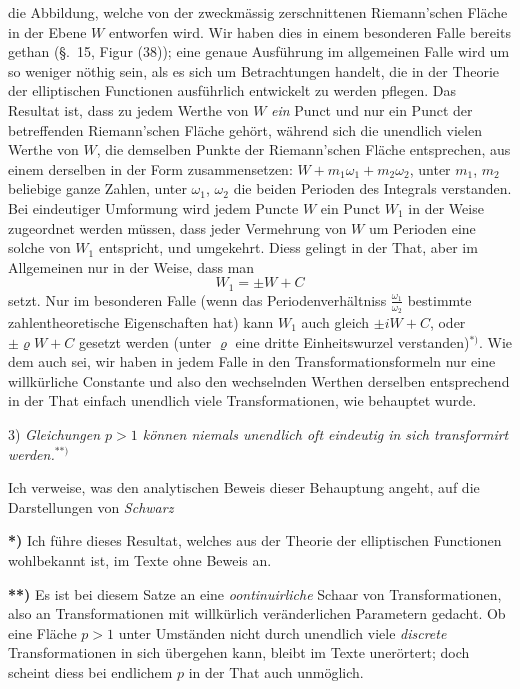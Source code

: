 \documentclass{article}
\begin{document}
die Abbildung, welche von der zweckmässig zerschnittenen Riemann'schen Fläche in der Ebene $W$ entworfen wird. Wir haben dies in einem besonderen Falle bereits gethan (§.~15, Figur (38)); eine genaue Ausführung im allgemeinen Falle wird um so weniger nöthig sein, als es sich um Betrachtungen handelt, die in der Theorie der elliptischen Functionen ausführlich entwickelt zu werden pflegen. Das Resultat ist, dass zu jedem Werthe von $W$ \emph{ein} Punct und nur ein Punct der betreffenden Riemann'schen Fläche gehört, während sich die unendlich vielen Werthe von $W$, die demselben Punkte der Riemann'schen Fläche entsprechen, aus einem derselben in der Form zusammensetzen: $W + m_{1}\omega_{1} + m_{2}\omega_{2}$, unter $m_{1}$, $m_{2}$ beliebige ganze Zahlen, unter $\omega_{1}$, $\omega_{2}$ die beiden Perioden des Integrals verstanden. Bei eindeutiger Umformung wird jedem Puncte $W$ ein Punct $W_{1}$ in der Weise zugeordnet werden müssen, dass jeder Vermehrung von $W$ um Perioden eine solche von $W_{1}$ entspricht, und umgekehrt. Diess gelingt in der That, aber im Allgemeinen nur in der Weise, dass man
\[ W_{1} = \pm W + C \]
setzt. Nur im besonderen Falle (wenn das Periodenverhältniss $\frac{\omega_{1}}{\omega_{2}}$ bestimmte zahlentheoretische Eigenschaften hat) kann $W_{1}$ auch gleich $\pm iW + C$, oder $\pm \varrho W + C$ gesetzt werden (unter $\varrho$ eine dritte Einheitswurzel verstanden)${}^{*)}$. Wie dem auch sei, wir haben in jedem Falle in den Transformationsformeln nur eine willkürliche Constante und also den wechselnden Werthen derselben entsprechend in der That einfach unendlich viele Transformationen, wie behauptet wurde.

3) \emph{Gleichungen $p > 1$ können niemals unendlich oft eindeutig in sich transformirt werden.}${}^{**)}$

Ich verweise, was den analytischen Beweis dieser Behauptung angeht, auf die Darstellungen von \emph{Schwarz}

\textbf{*)} Ich führe dieses Resultat, welches aus der Theorie der elliptischen Functionen wohlbekannt ist, im Texte ohne Beweis an.

\textbf{**)} Es ist bei diesem Satze an eine \emph{oontinuirliche} Schaar von Transformationen, also an Transformationen mit willkürlich veränderlichen Parametern gedacht. Ob eine Fläche $p > 1$ unter Umständen nicht durch unendlich viele \emph{discrete} Transformationen in sich übergehen kann, bleibt im Texte unerörtert; doch scheint diess bei endlichem $p$ in der That auch unmöglich.
\end{document}
